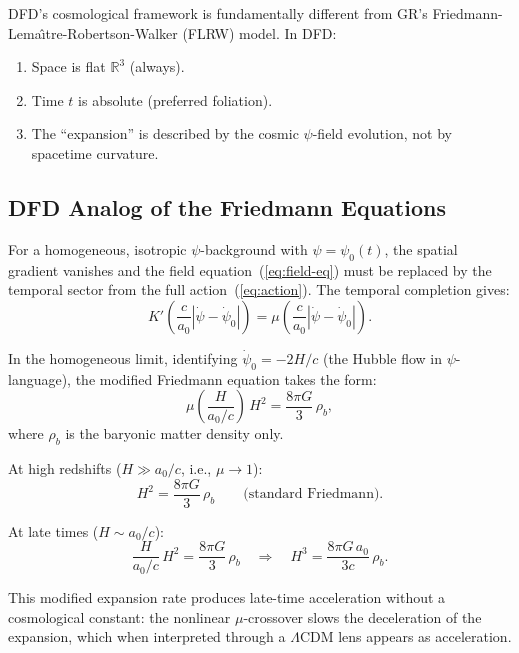 \documentclass[aps,prd,twocolumn,superscriptaddress,nofootinbib]{revtex4-2}
\begin{document}
DFD's cosmological framework is fundamentally different from
GR's Friedmann-Lema\^{\i}tre-Robertson-Walker (FLRW) model. In DFD:
\begin{enumerate}[nosep]
\item Space is flat $\mathbb{R}^3$ (always).
\item Time $t$ is absolute (preferred foliation).
\item The ``expansion'' is described by the cosmic $\psi$-field
  evolution, not by spacetime curvature.
\end{enumerate}

\subsection{DFD Analog of the Friedmann Equations}

For a homogeneous, isotropic $\psi$-background with
$\psi = \psi_0(t)$, the spatial gradient vanishes and the field
equation~(\ref{eq:field-eq}) must be replaced by the temporal
sector from the full action~(\ref{eq:action}). The temporal
completion gives:
\begin{equation}\label{eq:temporal-eq}
K'\!\left(\frac{c}{a_0}|\dot\psi - \dot\psi_0|\right)
= \mu\!\left(\frac{c}{a_0}|\dot\psi - \dot\psi_0|\right).
\end{equation}

In the homogeneous limit, identifying
$\dot\psi_0 = -2H/c$ (the Hubble flow in $\psi$-language), the
modified Friedmann equation takes the form:
\begin{equation}\label{eq:dfd-friedmann1}
\mu\!\left(\frac{H}{a_0/c}\right)\,H^2
= \frac{8\pi G}{3}\,\rho_b,
\end{equation}
where $\rho_b$ is the baryonic matter density only.

At high redshifts ($H \gg a_0/c$, i.e., $\mu \to 1$):
\begin{equation}
H^2 = \frac{8\pi G}{3}\,\rho_b
\qquad\text{(standard Friedmann)}.
\end{equation}

At late times ($H \sim a_0/c$):
\begin{equation}
\frac{H}{a_0/c}\,H^2 = \frac{8\pi G}{3}\,\rho_b
\quad\Rightarrow\quad
H^3 = \frac{8\pi G\,a_0}{3c}\,\rho_b.
\end{equation}

This modified expansion rate produces late-time acceleration
without a cosmological constant: the nonlinear $\mu$-crossover
slows the deceleration of the expansion, which when interpreted
through a $\Lambda$CDM lens appears as acceleration.
\end{document}
